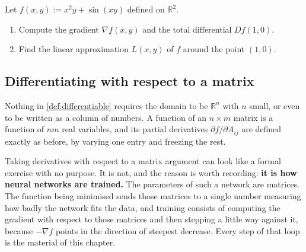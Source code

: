 



\begin{aiexercise}
\label{ex:ai_differential_linearization}
Let $f(x,y) := x^2 y + \sin(xy)$ defined on $\mathbb{R}^2$.
\begin{enumerate}[label=\textbf{(\alph*)}]
  \item Compute the gradient $\nabla f(x,y)$ and the total differential $Df(1,0)$.
  \item Find the linear approximation $L(x,y)$ of $f$ around the point $(1,0)$.
\end{enumerate}
\end{aiexercise}

\subsection{Differentiating with respect to a matrix}
\label{sec:differentiating_wrt_matrix}

Nothing in \cref{def:differentiable} requires the domain to be $\mathbb{R}^n$ with $n$ small, or
even to be written as a column of numbers. A function of an $n\times m$ matrix is a function of
$nm$ real variables, and its partial derivatives $\partial f/\partial A_{ij}$ are defined exactly
as before, by varying one entry and freezing the rest.

\begin{remark}
Taking derivatives with respect to a matrix argument can look like a formal exercise with no
purpose. It is not, and the reason is worth recording: \textbf{it is how neural networks are
trained.} The parameters of such a network are matrices. The function being minimised sends those
matrices to a single number measuring how badly the network fits the data, and training consists
of computing the gradient with respect to those matrices and then stepping a little way against
it, because $-\nabla f$ points in the direction of steepest decrease. Every step of that loop is
the material of this chapter.
\end{remark}


